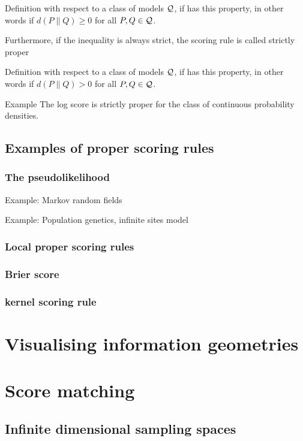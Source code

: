 Definition with respect to a class of models $\mathcal{Q}$, if  has this property, in other words if $d(P\|Q)\geq 0$ for all $P,Q\in\mathcal{Q}$.

Furthermore, if the inequality is always strict, the scoring rule is called strictly proper

Definition with respect to a class of models $\mathcal{Q}$, if  has this property, in other words if $d(P\|Q)>0$ for all $P,Q\in\mathcal{Q}$.

Example The log score is strictly proper for the class of continuous probability densities.

\section{Examples of proper scoring rules}

\subsection{The pseudolikelihood}

Example: Markov random fields

Example: Population genetics, infinite sites model

\subsection{Local proper scoring rules}

\subsection{Brier score}

\subsection{kernel scoring rule}

\chapter{Visualising information geometries}

\chapter[score matching]{Score matching}

\section{Infinite dimensional sampling spaces}

